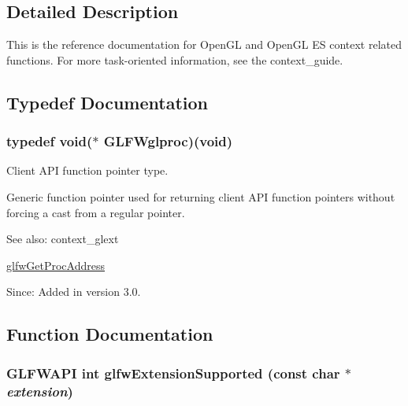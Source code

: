 \subsection{Detailed Description}
This is the reference documentation for OpenGL and OpenGL ES context related functions. For more task-oriented information, see the context\_\-guide. 

\subsection{Typedef Documentation}
\hypertarget{group__context_gbf42b10edde1c4fc71e212e576b9f811}{
\subsubsection[GLFWglproc]{\setlength{\rightskip}{0pt plus 5cm}typedef void($\ast$ {\bf GLFWglproc})(void)}}
\label{group__context_gbf42b10edde1c4fc71e212e576b9f811}


Client API function pointer type. 

Generic function pointer used for returning client API function pointers without forcing a cast from a regular pointer.

\begin{Desc}
\item[See also:]context\_\-glext 

\hyperlink{group__context_g0e8af175218929615c16e74938c10f2a}{glfwGetProcAddress}\end{Desc}
\begin{Desc}
\item[Since:]Added in version 3.0. \end{Desc}


\subsection{Function Documentation}
\hypertarget{group__context_g9a28c712d35f9e43534e1d03b051c04c}{
\subsubsection[glfwExtensionSupported]{\setlength{\rightskip}{0pt plus 5cm}GLFWAPI int glfwExtensionSupported (const char $\ast$ {\em extension})}}
\label{group__context_g9a28c712d35f9e43534e1d03b051c04c}


